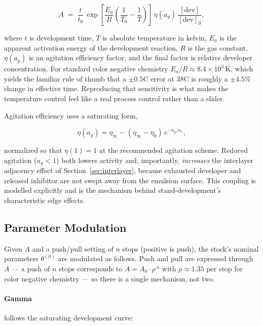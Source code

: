 \begin{equation}
A \;=\; \frac{t}{t_0}\,\exp\!\left[\frac{E_a}{R}\left(\frac{1}{T_0} - \frac{1}{T}\right)\right]\, \eta(a_g)\, \frac{[\mathrm{dev}]}{[\mathrm{dev}]_0},
\label{eq:activity}
\end{equation}

where $t$ is development time, $T$ is absolute temperature in kelvin, $E_a$ is
the apparent activation energy of the development reaction, $R$ is the gas
constant, $\eta(a_g)$ is an agitation efficiency factor, and the final factor
is relative developer concentration. For standard color negative chemistry
$E_a/R \approx 8.4 \times 10^3$\,K, which yields the familiar rule of thumb that
a $\pm 0.5$\textdegree C error at 38\textdegree C is roughly a $\pm 4.5\%$ change
in effective time. Reproducing that sensitivity is what makes the temperature
control feel like a real process control rather than a slider.

Agitation efficiency uses a saturating form,

\begin{equation}
\eta(a_g) = \eta_\infty - (\eta_\infty - \eta_0)\,e^{-a_g/a_c},
\end{equation}

normalized so that $\eta(1) = 1$ at the recommended agitation scheme. Reduced
agitation ($a_g < 1$) both lowers activity and, importantly, \emph{increases}
the interlayer adjacency effect of Section~\ref{sec:interlayer}, because
exhausted developer and released inhibitor are not swept away from the emulsion
surface. This coupling is modelled explicitly and is the mechanism behind
stand-development's characteristic edge effects.

\subsection{Parameter Modulation}

Given $A$ and a push/pull setting of $n$ stops (positive is push), the stock's
nominal parameters $\theta^{(0)}$ are modulated as follows. Push and pull are
expressed through $A$ --- a push of $n$ stops corresponds to
$A = A_0 \cdot \rho^{\,n}$ with $\rho \approx 1.35$ per stop for color negative
chemistry --- so there is a single mechanism, not two.

\paragraph{Gamma} follows the saturating development curve:

